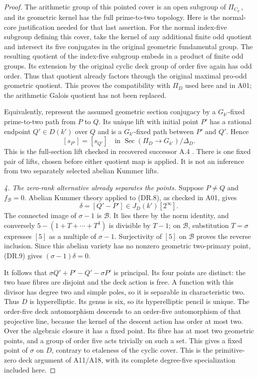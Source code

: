 \begin{proof}
The arithmetic group of this pointed cover is an open subgroup of
$\Pi_{C_{k'}}$, and its geometric kernel has the full prime-to-two
topology.  Here is the normal-core justification needed for that
last assertion.  For the normal index-five subgroup defining this
cover, take the kernel of any additional finite odd quotient and
intersect its five conjugates in the original geometric fundamental
group.  The resulting quotient of the index-five subgroup embeds in
a product of finite odd groups.  Its extension by the original cyclic
deck group of order five again has odd order.  Thus that quotient
already factors through the original maximal pro-odd geometric
quotient.  This proves the compatibility with $\Pi_D$ used here and
in A01; the arithmetic Galois quotient has not been replaced.

Equivalently, represent the assumed geometric section conjugacy by a
$G_{k'}$-fixed prime-to-two path from $P$ to $Q$.  Its unique lift with
initial point $P'$ has a rational endpoint $Q'\in D(k')$ over $Q$ and
is a $G_{k'}$-fixed path between $P'$ and $Q'$.  Hence
\[
             [s_{P'}]=[s_{Q'}]
             \quad\text{in }\operatorname{Sec}(\Pi_D\to G_{k'})/\Delta_D.
 \tag{DR.8}
\]
This is the full-section lift checked in recovered successor A.4
\cite[A.4]{ASrun}.  There is one fixed pair of lifts, chosen before
either quotient map is applied.  It is not an inference from two
separately selected abelian Kummer lifts.

\emph{4. The zero-rank alternative already separates the points.}
Suppose $P\ne Q$ and $f_{\mathcal B}=0$.  Abelian Kummer theory applied
to (DR.8), as checked in A01, gives
\[
                     \delta=[Q'-P']\in J_D(k')[2^\infty].
 \tag{DR.9}
\]
The connected image of $\sigma-1$ is $\mathcal B$.  It lies there by
the norm identity, and conversely $5-(1+T+\cdots+T^4)$ is divisible
by $T-1$; on $\mathcal B$, substitution $T=\sigma$ expresses $[5]$
as a multiple of $\sigma-1$.  Surjectivity of $[5]$ on
$\mathcal B$ proves the reverse inclusion.  Since this abelian variety
has no nonzero geometric two-primary point, (DR.9) gives
$(\sigma-1)\delta=0$.

It follows that $\sigma Q'+P'-Q'-\sigma P'$ is principal.  Its four
points are distinct: the two base fibres are disjoint and the deck
action is free.  A function with this divisor has degree two and
simple poles, so it is separable in characteristic two.  Thus $D$ is
hyperelliptic.  Its genus is six, so its hyperelliptic pencil is unique.
The order-five deck automorphism descends to an order-five
automorphism of that projective line, because the kernel of the
descent action has order at most two.  Over the algebraic closure it
has a fixed point.  Its fibre has at most two geometric points, and a
group of order five acts trivially on such a set.  This gives a fixed
point of $\sigma$ on $D$, contrary to etaleness of the cyclic cover.
This is the primitive-zero deck argument of A11/A18, with its complete
degree-five specialization included here.


\end{proof}
